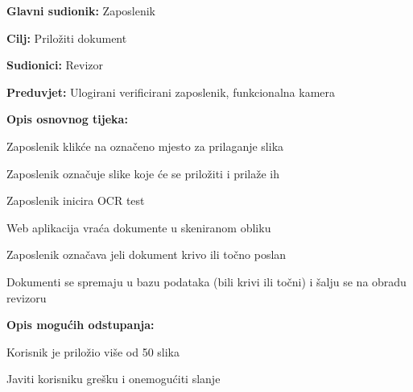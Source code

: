 					\noindent {}
					\begin{packed_item}
	
						\item \textbf{Glavni sudionik:} Zaposlenik
						\item  \textbf{Cilj:} Priložiti dokument
						\item  \textbf{Sudionici:} Revizor
						\item  \textbf{Preduvjet:} Ulogirani verificirani zaposlenik, funkcionalna kamera
						\item  \textbf{Opis osnovnog tijeka:}
						
						\item[] \begin{packed_enum}
	
							\item Zaposlenik klikće na označeno mjesto za prilaganje slika
							\item Zaposlenik označuje slike koje će se priložiti i prilaže ih
							\item Zaposlenik inicira OCR test
							\item Web aplikacija vraća dokumente u skeniranom obliku
							\item Zaposlenik označava jeli dokument krivo ili točno poslan
							\item Dokumenti se spremaju u bazu podataka (bili krivi ili točni) i šalju se na obradu revizoru
						\end{packed_enum}
						
						\item  \textbf{Opis mogućih odstupanja:}
						
						\item[] \begin{packed_item}
	
							\item[2.a] Korisnik je priložio više od 50 slika
							\item[] \begin{packed_enum}
								
								\item Javiti korisniku grešku i onemogućiti slanje
								
							\end{packed_enum}
							
						\end{packed_item}
					\end{packed_item}
				

